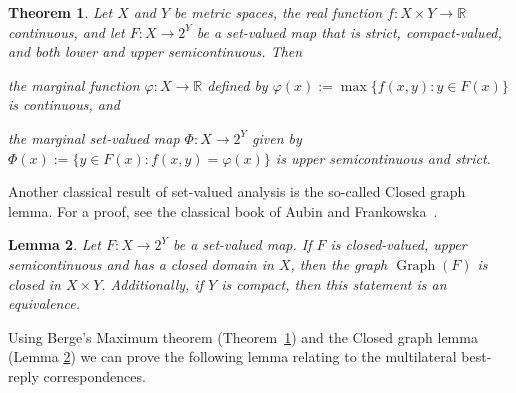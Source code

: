 \documentclass[a4paper,11pt,reqno,english]{amsart}
\theoremstyle{plain}
\newtheorem{theorem}{Theorem}[section]
\newtheorem{lemma}[theorem]{Lemma}
\theoremstyle{definition}
\begin{document}
\begin{theorem}
	\label{thm:MaximumTheorem}
	Let $X$ and $Y$ be metric spaces, the real function  $f\colon X\times Y\longrightarrow \mathbb{R}$ continuous, and let $F\colon X\longrightarrow 2^Y$ be a set-valued map that is strict, compact-valued, and both lower and upper semicontinuous.
	Then
	\begin{compactenum}[\rm \quad (1)]
		\item the marginal function $\varphi\colon X\longrightarrow \mathbb{R}$ defined by $\varphi(x):=\max\{f(x,y)\colon y\in F(x)\}$ is continuous, and
		\item the marginal set-valued map $\Phi\colon X\longrightarrow 2^Y$ given by $\Phi(x):= \{y\in F(x)\colon f(x,y)=\varphi(x)\}$ is upper semicontinuous and strict.
	\end{compactenum}
\end{theorem}

Another classical result of set-valued analysis is the so-called Closed graph lemma.
For a proof, see the classical book of Aubin and Frankowska~\cite[Thm.\,17.11]{Aubin_Frankowska_2009}.

\begin{lemma}\label{lem:ClosedGraphLemma}
	Let $F\colon X\longrightarrow 2^Y$ be a set-valued map.
	If $F$ is closed-valued, upper semicontinuous and has a closed domain in $X$, then the graph $\operatorname{Graph}(F)$ is closed in $X\times Y$.
	Additionally, if $Y$ is compact, then this statement is an equivalence.
\end{lemma}

Using Berge's Maximum theorem (Theorem~\ref{thm:MaximumTheorem}) and the Closed graph lemma (Lemma \ref{lem:ClosedGraphLemma}) we can prove the following lemma relating to the multilateral best-reply correspondences.
\end{document}
